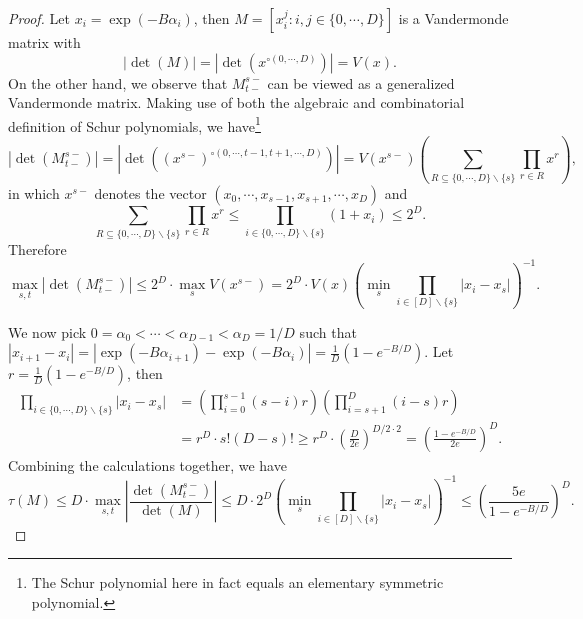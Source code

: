 \documentclass[10pt,a4paper]{article}
\theoremstyle{remark}
\numberwithin{equation}{section}
\numberwithin{theorem}{section}
\begin{document}
\begin{proof}
Let $x_i = \exp(-B\alpha_i)$, then
$M = [x_i^j: i, j \in \{0, \cdots, D\}]$ is a Vandermonde matrix with
\[|\det(M)| = |\det(x^{\circ(0, \cdots, D)})| = V(x).\]
On the other hand, we observe that $M_{t-}^{s-}$ can be viewed as a generalized Vandermonde matrix. Making use of both the algebraic and combinatorial definition of Schur polynomials, we have\footnote{The Schur polynomial here in fact equals an elementary symmetric polynomial.}
\[|\det (M_{t-}^{s-})| = |\det((x^{s-})^{\circ(0, \cdots, t-1, t+1, \cdots, D)})|
= V(x^{s-}) \left( \sum_{R\subseteq \{0, \cdots, D\}\backslash\{s\}}\prod_{r\in R}x^r \right),\]
in which $x^{s-}$ denotes the vector $(x_0, \cdots, x_{s-1}, x_{s+1}, \cdots, x_D)$ and
\[\sum_{R\subseteq \{0, \cdots, D\}\backslash\{s\}}\prod_{r\in R}x^r 
\le \prod_{i \in \{0, \cdots, D\} \backslash \{s\}}(1 + x_i) \le 2^D.\]
Therefore
\[\max_{s, t} |\det (M_{t-}^{s-})|
\le 2^D \cdot \max_s V(x^{s-}) = 2^D \cdot V(x)
\left( \min_s \prod_{i \in [D]\backslash \{s\}} |x_i - x_s| \right)^{-1}. \]

We now pick $0 = \alpha_0 < \cdots < \alpha_{D-1} < \alpha_{D} = 1/D$ such that
$|x_{i+1} - x_i| = |\exp(-B\alpha_{i+1}) - \exp(-B\alpha_i)|
= \frac 1{D}(1 - e^{-B/D})$. Let $r = \frac 1{D}(1 - e^{-B/D})$, then
\begin{align*}
\prod_{i \in \{0, \cdots, D\} \backslash \{s\}} |x_i - x_s|
&= \left(\prod_{i=0}^{s-1} (s - i) r \right)
\left(\prod_{i=s+1}^{D} (i-s) r\right) \\
&= r^{D} \cdot s! (D-s)!
\ge r^{D} \cdot (\frac{D}{2e})^{D/2 \cdot 2} = (\frac{1 - e^{-B/D}}{2e})^{D}.
\end{align*}
Combining the calculations together, we have
\[\tau(M) \le D \cdot \max_{s, t}\left|\frac{\det(M^{s-}_{t-})}{\det(M)}\right| 
\le D \cdot 2^D\left( \min_s \prod_{i \in [D]\backslash \{s\}} |x_i - x_s| \right)^{-1} \le \left(\frac{5e}{1 - e^{-B/D}}\right)^D.\]
\end{proof}
\end{document}
